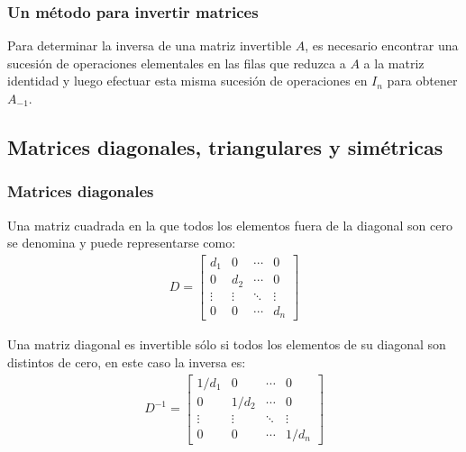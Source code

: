 \documentclass[a4paper,12pt]{article}
\begin{document}
\subsubsection{Un método para invertir matrices}

\begin{concept}[i]
  Para determinar la inversa de una matriz invertible $A$, es necesario
  encontrar una sucesión de operaciones elementales en las filas que reduzca a
  $A$ a la matriz identidad y luego efectuar esta misma sucesión de
  operaciones en $I_n$ para obtener $A_{-{1}}$.
\end{concept}


\subsection{Matrices diagonales, triangulares y simétricas}

\subsubsection{Matrices diagonales}

\begin{concept}
  Una matriz cuadrada en la que todos los elementos fuera de la diagonal son
  cero se denomina  y puede representarse como:
  \begin{align*}
    D=
  \begin{bmatrix}
    d_1&   0& \cdots& 0 \\
    0&   d_2& \cdots& 0 \\
    \vdots&\vdots & \ddots  &\vdots  \\
    0&   0& \cdots& d_n 
  \end{bmatrix}
  \end{align*}
\end{concept}

Una matriz diagonal es invertible sólo si todos los elementos de su diagonal
son distintos de cero, en este caso la inversa es:
\begin{align*}
  D^{-1}=
\begin{bmatrix}
  1/d_1 &   0   & \cdots  & 0 \\
  0     &  1/d_2& \cdots  & 0 \\
  \vdots&\vdots & \ddots  &\vdots  \\
  0     &   0   & \cdots  & 1/d_n 
\end{bmatrix}
\end{align*}
\end{document}
